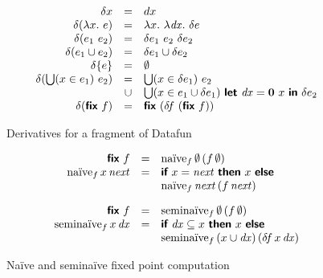 \documentclass[sigplan,screen,review,timestamp,dvipsnames]{acmart}
\renewcommand{\d}{\delta}
\newcommand{\dzero}{\mathbf{0}~} %
\newcommand{\fn}{\lambda}
\newcommand{\binder}{.~}
\newcommand{\bind}[1]{#1\binder}
\newcommand{\fnof}[1]{\fn\bind{#1}}
\newcommand{\kw}[1]{\textsf{\bfseries#1}}
\newcommand{\ebiglub}[1]{\bigcup(#1)~}
\newcommand{\elet}[1]{\kw{let}~#1~\kw{in}~}
\newcommand{\subst}[1]{\,[#1]}
\newcommand{\efix}{\kw{fix}~}
\newcommand{\tlv}[1]{\textrm{#1}}
\newcommand{\var}[1]{\mathit{#1}}
\newcommand{\dee}[1]{\var{d#1}}
\begin{document}
\begin{figure}
  \[\begin{array}{rcl}
    \d x &=& dx\\
    \d(\fnof x e) &=& \fnof x \fnof{\dee x} \d{e}\\
    \d(e_1~e_2) &=& \d{e_1}~e_2~\d{e_2}\\
    \d(e_1 \cup e_2) &=& \d{e_1} \cup \d{e_2}\\
    \d{\{e\}} &=& \emptyset\\
    \d(\ebiglub{x \in e_1} e_2)
    &=& \ebiglub{x \in \d{e_1}} e_2\\
    &\cup& \ebiglub{x \in e_1 \cup \d{e_1}}
    \elet{\dee x = \dzero x}
    \d{e_2}
    \\
    \d(\efix f) &=& \efix (\d\!f~(\efix f))
  \end{array}\]
  \caption{Derivatives for a fragment of Datafun}
  \label{fig:derivatives}
\end{figure}

\begin{figure}
  \[
  \begin{array}{rcl}
  \efix f &=& \tlv{na\"ive}_f \,\emptyset \,(f\, \emptyset)\\
  \tlv{na\"ive}_f \,x \,\var{next}
  &=& \kw{if}~ x = \var{next} ~\kw{then}~ x ~\kw{else}\\
  && \tlv{na\"ive}_f \,\var{next} \,(f \,\var{next})

  \vspace{1em}\\

  \efix f &=& \tlv{semina\"ive}_f \,\emptyset \,(f\, \emptyset)\\
  \tlv{semina\"ive}_f \,x \,\dee x
  &=& \kw{if}~ \dee x \subseteq x ~\kw{then}~ x ~\kw{else}\\
  && \tlv{semina\"ive}_f \,(x \cup \dee x) \,(\d\!f \,x \,\dee x)

  \end{array}
  \]
  \caption{Na\"ive and semina\"ive fixed point computation}
  \label{fig:defining-fix}
\end{figure}
\end{document}
